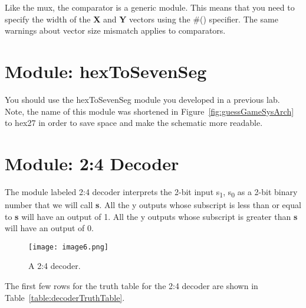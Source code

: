 Like the mux, the comparator is a generic module. This means that you
need to specify the width of the \textbf{X} and \textbf{Y} vectors 
using the \#() specifier. The same warnings about vector size mismatch 
applies to comparators.


\section{Module: hexToSevenSeg}
You should use the hexToSevenSeg module you developed in a
previous lab. Note, the name of this module was shortened in Figure~\ref{fig:guessGameSysArch}
to hex27 in order to save space and make the schematic more
readable.


\section{Module: 2:4 Decoder}


The module labeled 2:4 decoder interprets the 2-bit input
s\textsubscript{1}, s\textsubscript{0} as a 2-bit binary number that we
will call \textbf{s}. All the y outputs whose subscript is less than or
equal to \textbf{s} will have an output of 1. All the y outputs whose
subscript is greater than \textbf{s} will have an output of 0.

\begin{figure}[ht]
\texttt{[image: image6.png]}
\caption{A 2:4 decoder.}
\label{fig:2x4decoderSymbol}
\end{figure}

The first few rows for the truth table for the 2:4 decoder are shown in
Table~\ref{table:decoderTruthTable}.

